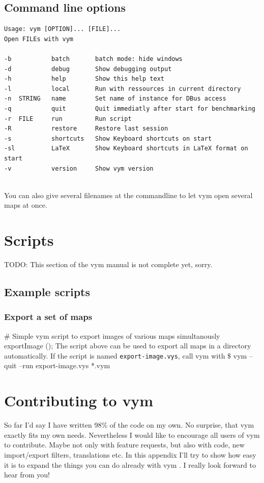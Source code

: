 \documentclass[12pt,a4paper]{article}
\newcommand{\vym}{{\sc vym }}
\newenvironment{code}[1] { \verbatim #1}{\endverbatim  }
\begin{document}
\begin{appendix}
\subsection{Command line options} \label{options} 
\begin{verbatim}
Usage: vym [OPTION]... [FILE]... 
Open FILEs with vym

-b           batch       batch mode: hide windows
-d           debug       Show debugging output
-h           help        Show this help text
-l           local       Run with ressources in current directory
-n  STRING   name        Set name of instance for DBus access
-q           quit        Quit immediatly after start for benchmarking
-r  FILE     run         Run script
-R           restore     Restore last session
-s           shortcuts   Show Keyboard shortcuts on start
-sl          LaTeX       Show Keyboard shortcuts in LaTeX format on start
-v           version     Show vym version


\end{verbatim}
You can also give several filenames at the commandline to let \vym open
several maps at once.
 

\section{Scripts} \label{scripts}   %

TODO: This section of the \vym manual is not complete yet, sorry.

\subsection{Example scripts}
\subsubsection{Export a set of maps}
\begin{code}
\# Simple vym script to export images of various maps simultanously
exportImage ();
\end{code}
The script above can be used to export all maps in a directory
automatically. If the script is named {\tt export-image.vys}, call \vym
with
\begin{code}
\$ vym --quit --run export-image.vys *.vym
\end{code}


\section{Contributing to \vym}
So far I'd say I have written 98\% of the code on my own. No surprise,
that \vym exactly fits my own needs. Nevertheless I would like to
encourage all users of  \vym to contribute. Maybe not only with feature
requests, but also with code, new import/export filters, translations
etc. In this appendix I'll try to show how easy it is to expand the
things you can do already with \vym. I really look forward to hear from
you!


\end{appendix}
\end{document}
